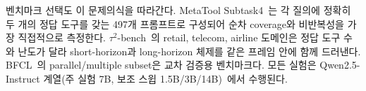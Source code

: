 벤치마크 선택도 이 문제의식을 따라간다. MetaTool Subtask4~\citep{MetaTool}는 각 질의에 정확히 두 개의 정답 도구를 갖는 497개 프롬프트로 구성되어 순차 coverage와 비반복성을 가장 직접적으로 측정한다. $\tau^2$-bench~\citep{tau2bench}의 retail, telecom, airline 도메인은 정답 도구 수와 난도가 달라 short-horizon과 long-horizon 체제를 같은 프레임 안에 함께 드러낸다. BFCL~\citep{BFCL}의 parallel/multiple subset은 교차 검증용 벤치마크다. 모든 실험은 Qwen2.5-Instruct 계열(주 실험 7B, 보조 스윕 1.5B/3B/14B)~\citep{qwen25}에서 수행된다.

